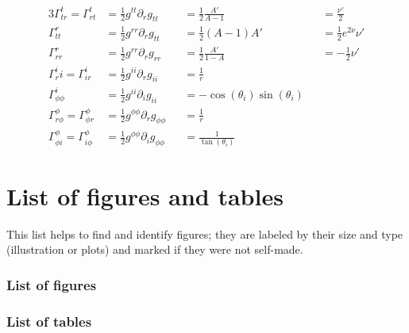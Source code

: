 \documentclass[12pt,a4paper]{report}
\numberwithin{equation}{chapter}
\newcommand{\tinychapter}[1]{%
\addtocounter{chapter}{1}%
\setcounter{section}{0}%
\setcounter{subsection}{0}%
\addcontentsline{toc}{chapter}{\protect\numberline{\thechapter} #1}
\section*{\thechapter\quad{} #1}}
\newcommand{\tinysection}[1]{%
\addtocounter{section}{1}%
\setcounter{subsection}{0}%
\addcontentsline{toc}{section}{\protect\numberline{\thesection} #1}
\subsection*{\thesection\quad{} #1}}
\begin{document}
\begin{appendices}
\begin{alignat}{3}
\Gamma^t_{tr} = \Gamma^t_{rt}
&= \frac 12 g^{tt} \partial_r g_{tt}
&&= \frac 12 \frac{ A' }{ A - 1}
&&= \frac{ \nu' }2
\\
\Gamma^r_{tt}
&= \frac 12 g^{rr} \partial_r g_{tt}
&&= \frac 12 (A - 1) A'
&&= \frac 12 e^{2 \nu} \nu'
\\
\Gamma^r_{rr}
&= \frac 12 g^{rr} \partial_r g_{rr}
&&= \frac 12 \frac{ A' }{1 - A}
&&= -\frac 12 \nu'
\\
\Gamma^i_ri = \Gamma^i_{ir}
&= \frac 12 g^{ii} \partial_r g_{ii}
&&= \frac 1r
\\
\Gamma^i_{\phi\phi}
&= \frac 12 g^{ii} \partial_i g_{ii}
&&= -\cos(\theta_i)\sin(\theta_i)
\\
\Gamma^\phi_{r\phi} = \Gamma^\phi_{\phi r}
&= \frac 12 g^{\phi\phi} \partial_r g_{\phi\phi}
&&= \frac 1r
\\
\Gamma^\phi_{\phi i} = \Gamma^\phi_{i \phi}
&= \frac 12 g^{\phi\phi} \partial_i g_{\phi\phi}
&&= \frac 1{\tan(\theta_i)}
\end{alignat}


\end{appendices}
\newpage
\chapter*{List of figures and tables}


This list helps to find and identify figures; they are labeled by their size and type (illustration or plots) and marked if they were not self-made.

\subsection*{List of figures}
{\makeatletter
\renewcommand*{\addvspace}[1]{}
\makeatother }

\subsection*{List of tables}
\end{document}
